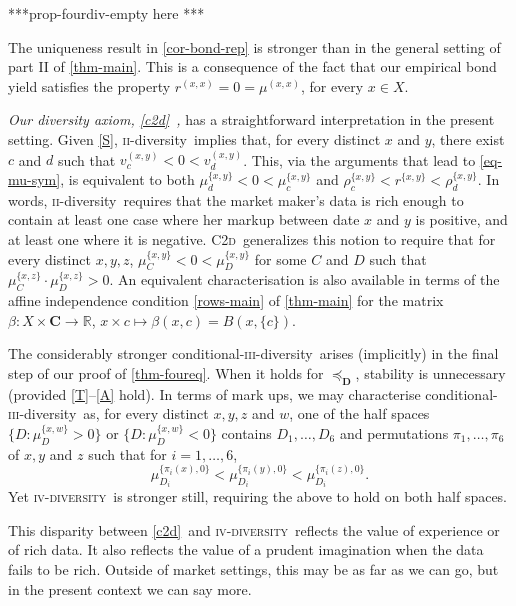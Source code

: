\documentclass[ecta,nameyear,draft]{econsocart}
\newcommand{\R}{\mathbb R}
\newcommand{\mbbd}{{\mathbf D}}
\newcommand{\mbbc}{{\mathbf C}}
\newcommand{\xx}{(x,x)}
\newcommand{\xy}{{(x, y)}}
\newcommand{\stability}{\ref{S}}
\newcommand{\Condtwodiv}{\textsc{C2d}}
\newcommand{\condthreediv}{\textup{conditional-\textsc{iii}-diversity}}
\newcommand{\twodiv}{\textsc{ii}-\textup{diversity}}
\newcommand{\fourdiv}{\textsc{iv}-\textsc{diversity}}
\theoremstyle{plain}
\theoremstyle{remark}
\begin{document}
***prop-fourdiv-empty here ***

The uniqueness result in \cref{cor-bond-rep} is stronger than in the general
setting of part II of \cref{thm-main}. This is a consequence of the fact that
our empirical bond yield satisfies the property $r^{\xx} = 0 = \mu^{\xx}$, for
every $x \in X$. 

\emph{Our diversity axiom, \ref{c2d}\ ,} has a straightforward
interpretation in the present setting. Given \stability, \twodiv\ implies that,
for every distinct $x$ and $y$, there exist $c$ and $d$ such that $v^{\xy}_{c}
< 0 < v^{\xy}_{d}$.  This, via the arguments that lead to \cref{eq-mu-sym}, is
equivalent to both $\mu^{\{x,y\}}_{d} < 0 < \mu^{\{x,y\}}_{c}$ and
$\rho^{\{x,y\}}_{c} < r^{\{x,y\}} < \rho^{\{x,y\}}_{d}$.  In words, \twodiv\
requires that the market maker's data is rich enough to contain at least one
case where her markup between date $x$ and $y$ is positive, and at least one
where it is negative.
\Condtwodiv\ {generalizes} this notion to require that for every distinct $x,
y, z$, $\mu^{\{x,y\}}_{C} < 0 < \mu^{\{x,y\}}_{D}$ for some $C$ and $D$ such
that $\mu^{\{x,z\}}_{C}\cdot \mu^{\{x,z\}}_{D} >0$. An equivalent
characterisation is also available in terms of the affine independence
condition \ref{rows-main} of \cref{thm-main} for the matrix $\beta: X \times
\mbbc \rightarrow \R$, $x\times c \mapsto \beta(x, c) = B(x, \{c\})$.

The considerably stronger \condthreediv\ arises (implicitly) in
the final step of our proof of \cref{thm-foureq}. When it holds for
$\preceq_{\mbbd}$, {stability} is unnecessary (provided \ref{T}--\ref{A} hold).
In terms of mark ups, we may characterise \condthreediv\ as,
for every distinct $x, y, z$ and $w$, one of the half spaces $\{D :
\mu^{\{x,w\}}_D > 0\}$ or $\{D: \mu^{\{x,w\}}_D < 0\}$ contains $D_1, \dots,
D_6$ and permutations $\pi_1, \dots, \pi_6$ of $x, y$ and $z$ such that for
$i=1,\dots,6$, 
\begin{equation*}
  \mu^{\{\pi_i(x),0\}}_{D_i} < \mu^{\{\pi_i(y),0\}}_{D_i} <
  \mu^{\{\pi_i(z),0\}}_{D_i}.
\end{equation*}
Yet \fourdiv\ is stronger still, requiring the above to hold on both half
spaces.

This disparity between \ref{c2d}\ and \fourdiv\ reflects the value of
experience or of rich data. It also reflects the value of a prudent imagination
when the data fails to be rich.  Outside of market settings, this may be as far
as we can go, but in the present context we can say more.
\end{document}
